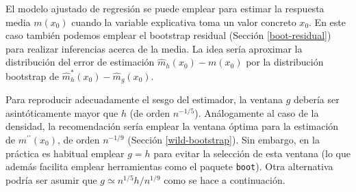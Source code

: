 \documentclass[
]{book}
\theoremstyle{break}
\theoremstyle{definition}
\theoremstyle{definition}
\theoremstyle{definition}
\theoremstyle{remark}
\begin{document}
El modelo ajustado de regresión se puede emplear para estimar la respuesta media \(m(x_0)\) cuando la variable explicativa toma un valor concreto \(x_0\).
En este caso también podemos emplear el bootstrap residual (Sección \ref{boot-residual}) para realizar inferencias acerca de la media.
La idea sería aproximar la distribución del error de estimación \(\hat{m}_h(x_0) - m(x_0)\) por la distribución bootstrap de \(\hat{m}^{\ast}_h(x_0) - \hat{m}_g(x_0)\).

Para reproducir adecuadamente el sesgo del estimador, la ventana \(g\) debería ser asintóticamente mayor que \(h\) (de orden \(n^{-1/5}\)).
Análogamente al caso de la densidad, la recomendación sería emplear la ventana óptima para la estimación de \(m^{\prime \prime }\left( x_0 \right)\), de orden \(n^{-1/9}\) (Sección \ref{wild-bootstrap}).
Sin embargo, en la práctica es habitual emplear \(g=h\) para evitar la selección de esta ventana (lo que además facilita emplear herramientas como el paquete \texttt{boot}).
Otra alternativa podría ser asumir que \(g \simeq n^{1/5}h/n^{1/9}\) como se hace a continuación.
\end{document}
